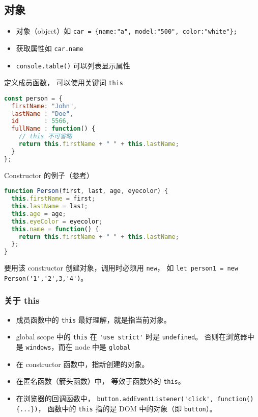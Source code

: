 \subsection{对象}
\begin{itemize}
\item 对象（object）如 \verb|car = {name:"a", model:"500", color:"white"};|
\item 获取属性如 \verb|car.name|
\item \verb|console.table()| 可以列表显示属性
\end{itemize}

定义成员函数， 可以使用关键词 \verb|this|
\begin{lstlisting}[language=js]
const person = {
  firstName: "John",
  lastName : "Doe",
  id       : 5566,
  fullName : function() {
    // this 不可省略
    return this.firstName + " " + this.lastName;
  }
};
\end{lstlisting}

Constructor 的例子（\href{https://www.w3schools.com/js/js_object_constructors.asp}{参考}）
\begin{lstlisting}[language=js]
function Person(first, last, age, eyecolor) {
  this.firstName = first;
  this.lastName = last;
  this.age = age;
  this.eyeColor = eyecolor;
  this.name = function() {
    return this.firstName + " " + this.lastName;
  };
}
\end{lstlisting}
要用该 constructor 创建对象，调用时必须用 \verb`new`， 如 \verb`let person1 = new Person('1','2',3,'4')`。

\subsubsection{关于 this}
\begin{itemize}
\item 成员函数中的 \verb`this` 最好理解，就是指当前对象。
\item global scope 中的 \verb`this` 在 \verb`'use strict'` 时是 \verb`undefined`。 否则在浏览器中是 \verb`windows`，而在 node 中是 \verb`global`
\item 在 constructor 函数中，指新创建的对象。
\item 在匿名函数（箭头函数）中， 等效于函数外的 \verb`this`。
\item 在浏览器的回调函数中， \verb`button.addEventListener('click', function() {...})`， 函数中的 \verb`this` 指的是 DOM 中的对象（即 \verb`button`）。
\end{itemize}

